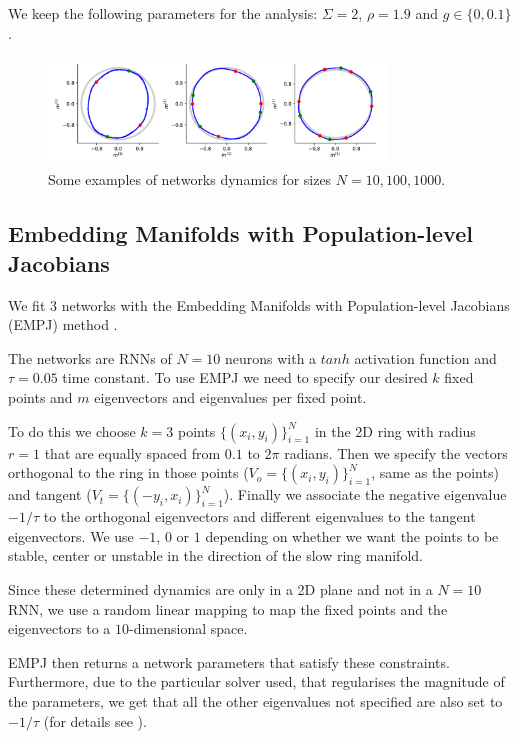 \documentclass{article} %
\newcounter{ct}
\theoremstyle{definition}
\theoremstyle{remark}
\begin{document}
We keep the following parameters for the analysis:
\(\Sigma=2\),
\(\rho=1.9\) and
\(g\in\{0, 0.1\}\).


\begin{figure}[h]
\centering
\includegraphics[width=0.8\textwidth]{N100_si2_rho1.9_g0_fp4.8.12}
\caption{Some examples of networks dynamics for sizes \(N=10,100,1000\).}\label{fig:low_rank_examples}
\end{figure}


\subsection{Embedding Manifolds with Population-level Jacobians}\label{sec:supp:empj}
We fit 3 networks with the Embedding Manifolds with Population-level Jacobians (EMPJ) method \citep{pollock2020}.

The networks are RNNs of $N=10$ neurons with a $tanh$ activation function and $\tau = 0.05$ time constant. To use EMPJ we need to specify our desired $k$ fixed points and $m$ eigenvectors and eigenvalues per fixed point. 

To do this we choose $k=3$ points $\{(x_i, y_i)\}_{i=1}^N$ in the 2D ring with radius $r=1$ that are equally spaced from $0.1$ to $2 \pi$ radians. Then we specify the vectors orthogonal to the ring in those points ($V_o = \{(x_i, y_i)\}_{i=1}^N$, same as the points) and tangent ($V_t = \{(-y_i, x_i)\}_{i=1}^N$). Finally we associate the negative eigenvalue $-1/\tau$ to the orthogonal eigenvectors and different eigenvalues to the tangent eigenvectors. We use $-1$, $0$ or $1$ depending on whether we want the points to be stable, center or unstable in the direction of the slow ring manifold. 

Since these determined dynamics are only in a 2D plane and not in a $N=10$ RNN, we use a random linear mapping to map the fixed points and the eigenvectors to a $10$-dimensional space.

EMPJ then returns a network parameters that satisfy these constraints. Furthermore, due to the particular solver used, that regularises the magnitude of the parameters, we get that all the other eigenvalues not specified are also set to $-1/\tau$ (for details see \citep{pollock2020}).
\end{document}

